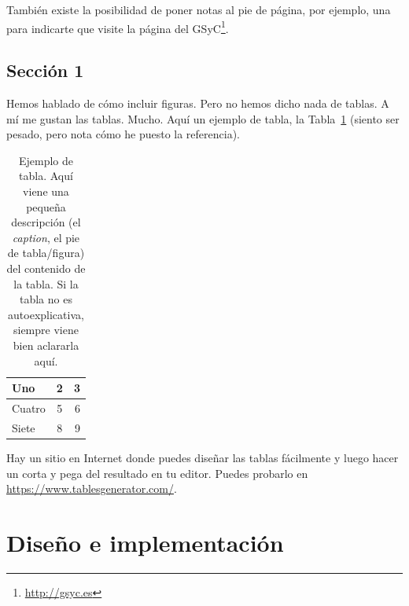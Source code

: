 \documentclass[a4paper, 12pt]{book}
\begin{document}
También existe la posibilidad de poner notas al pie de página, por ejemplo, una para indicarte que visite la página del GSyC\footnote{\url{http://gsyc.es}}.



\section{Sección 1} 
\label{sec:seccion1}

Hemos hablado de cómo incluir figuras.
Pero no hemos dicho nada de tablas.
A mí me gustan las tablas.
Mucho.
Aquí un ejemplo de tabla, la Tabla~\ref{tab:ejemplo} (siento ser pesado, pero nota cómo he puesto la referencia).

\begin{table}
 \begin{center}
  \begin{tabular}{ | l | c | r |} %
    \hline
    Uno & 2 & 3 \\ \hline %
    Cuatro & 5 & 6 \\ \hline
    Siete & 8 & 9 \\
    \hline
  \end{tabular}
  \caption{Ejemplo de tabla. Aquí viene una pequeña descripción (el \emph{caption}, el pie de tabla/figura) del contenido de la tabla. Si la tabla no es autoexplicativa, siempre viene bien aclararla aquí.}
  \label{tab:ejemplo}
 \end{center}
\end{table}

Hay un sitio en Internet donde puedes diseñar las tablas fácilmente y luego hacer un corta y pega del resultado en tu editor.
Puedes probarlo en \url{https://www.tablesgenerator.com/}.




\cleardoublepage
\chapter{Diseño e implementación}
\label{sec:diseno}
\end{document}
